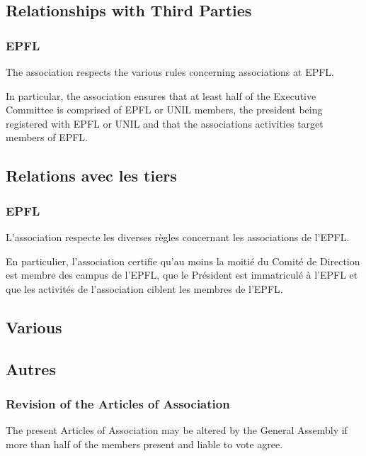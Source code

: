 \documentclass[12pt,a4paper,oneside]{article}
\newcounter{art}
\newcommand{\english}{    \switchcolumn[0]\noindent}
\newcommand{\french}{    \switchcolumn[1]\noindent}
\begin{document}
\begin{paracol}{2}
\english
	\subsection{Relationships with Third Parties}

	\subsubsection{EPFL}
	The association respects the various rules concerning associations at EPFL.

	In particular, the association ensures that at least half of the Executive Committee is comprised of EPFL or UNIL members, the president being registered with EPFL or UNIL and that the associations activities target members of EPFL. 


\french
	\subsection{Relations avec les tiers}

	\subsubsection{EPFL}
	L’association respecte les diverses règles concernant les associations de l’EPFL.

	En particulier, l’association certifie qu’au moins la moitié du Comité de Direction est membre des campus de l’EPFL, que le Président est immatriculé à l’EPFL et que les activités de l’association ciblent les membres de l’EPFL.






\english
	\subsection{Various}

\french
	\subsection{Autres}

	\english
	\subsubsection{Revision of the Articles of Association}
	The present Articles of Association may be altered by the General Assembly if more than half of the members present and liable to vote agree. 


\end{paracol}
\end{document}
